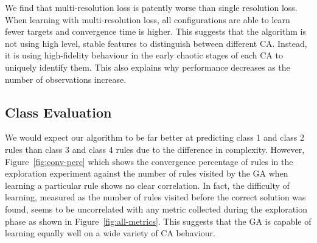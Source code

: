 \begin{table} \label{tab:multires-loss}
    \centering\hfill
    \hfill
    \hfill
\end{table}

We find that multi-resolution loss is patently worse than single resolution loss. When learning with multi-resolution loss, all configurations are able to learn fewer targets and convergence time is higher. This suggests that the algorithm is not using high level, stable features to distinguish between different CA. Instead, it is using high-fidelity behaviour in the early chaotic stages of each CA to uniquely identify them. This also explains why performance decreases as the number of observations increase.

\subsection{Class Evaluation}

We would expect our algorithm to be far better at predicting class 1 and class 2 rules than class 3 and class 4 rules due to the difference in complexity. However, Figure~\ref{fig:conv-perc} which shows the convergence percentage of rules in the exploration experiment against the number of rules visited by the GA when learning a particular rule shows no clear correlation. In fact, the difficulty of learning, measured as the number of rules visited before the correct solution was found, seems to be uncorrelated with any metric collected during the exploration phase as shown in Figure~\ref{fig:all-metrics}. This suggests that the GA is capable of learning equally well on a wide variety of CA behaviour.

